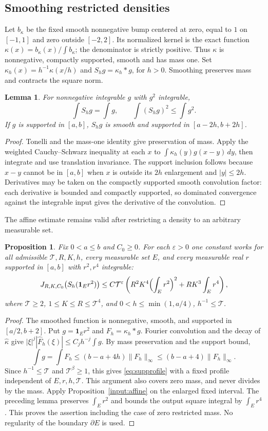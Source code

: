 \documentclass[11pt,a4paper,oneside]{article}
\newtheorem{lemma}[theorem]{Lemma}
\newtheorem{proposition}[theorem]{Proposition}
\theoremstyle{definition}
\newcommand{\eps}{\varepsilon}
\newcommand{\one}{\mathbf 1}
\numberwithin{equation}{section}
\begin{document}
\subsection{Smoothing restricted densities}
Let $b_\kappa$ be the fixed smooth nonnegative bump centered at zero, equal to $1$ on $[-1,1]$ and zero outside $[-2,2]$. Its normalized kernel is the exact function
$\kappa(x)=b_\kappa(x)/\int b_\kappa$; the denominator is strictly positive.
Thus $\kappa$ is nonnegative, compactly supported, smooth and has mass one.
Set $\kappa_h(x)=h^{-1}\kappa(x/h)$ and $S_hg=\kappa_h*g$, for $h>0$.
Smoothing preserves mass and contracts the square norm.
\begin{lemma}
For nonnegative integrable $g$ with $g^2$ integrable,
\[
 \int S_hg=\int g,\qquad \int(S_hg)^2\le\int g^2.
\]
If $g$ is supported in $[a,b]$, $S_hg$ is smooth and supported in
$[a-2h,b+2h]$.
\end{lemma}
\begin{proof}
Tonelli and the mass-one identity give preservation of mass. Apply the
weighted Cauchy--Schwarz inequality at each $x$ to
$\int\kappa_h(y)g(x-y)\,dy$, then integrate and use translation invariance.
The support inclusion follows because $x-y$ cannot be in $[a,b]$ when
$x$ is outside its $2h$ enlargement and $|y|\le2h$. Derivatives may be taken on the compactly supported smooth convolution factor: each derivative is bounded and compactly supported, so dominated convergence against the integrable input gives the derivative of the convolution.
\end{proof}
The affine estimate remains valid after restricting a density to an arbitrary measurable set.
\begin{proposition}\label{prop:maskedaff}
Fix $0<a\le b$ and $C_0\ge0$. For each $\eps>0$ one constant works for
all admissible $\mathcal T,R,K,h$, every measurable set $E$, and every
measurable real $r$ supported in $[a,b]$ with $r^2,r^4$ integrable:
\[
 J_{R,K,C_0}\bigl(S_h(\one_Er^2)\bigr)
 \le C\mathcal T^\eps
 \left(R^2K^4\Bigl(\int_Er^2\Bigr)^2+RK^3\int_Er^4\right),
\]
where $\mathcal T\ge2$, $1\le K\le R\le\mathcal T^4$, and
$0<h\le\min(1,a/4)$, $h^{-1}\le\mathcal T$.
\end{proposition}
\begin{proof}
The smoothed function is nonnegative, smooth, and supported in
$[a/2,b+2]$. Put $g=\one_Er^2$ and $F_h=\kappa_h*g$. Fourier convolution and the decay of $\widehat\kappa$ give $|\xi|^j|\widehat F_h(\xi)|\le C_jh^{-j}\int g$. By mass preservation and the support bound,
\[
 \int g=\int F_h\le(b-a+4h)\|F_h\|_\infty\le(b-a+4)\|F_h\|_\infty.
\]
Since $h^{-1}\le\mathcal T$ and $\mathcal T^\beta\ge1$, this gives \eqref{eq:supprofile} with a fixed profile independent of $E,r,h,\mathcal T$. This argument also covers zero mass, and never divides by the mass. Apply Proposition~\ref{input:affine} on the enlarged fixed
interval. The preceding lemma preserves $\int_Er^2$ and bounds the output
square integral by $\int_Er^4$. This proves the assertion including the
case of zero restricted mass. No regularity of the boundary $\partial E$ is used.
\end{proof}
\end{document}
